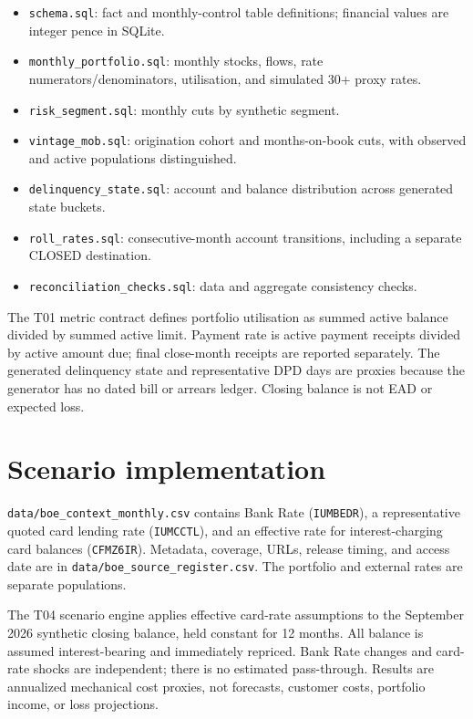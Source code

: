 \documentclass[11pt]{article}
\begin{document}
\begin{itemize}
\item \texttt{schema.sql}: fact and monthly-control table definitions; financial values are integer pence in SQLite.
\item \texttt{monthly\_portfolio.sql}: monthly stocks, flows, rate numerators/denominators, utilisation, and simulated 30+ proxy rates.
\item \texttt{risk\_segment.sql}: monthly cuts by synthetic segment.
\item \texttt{vintage\_mob.sql}: origination cohort and months-on-book cuts, with observed and active populations distinguished.
\item \texttt{delinquency\_state.sql}: account and balance distribution across generated state buckets.
\item \texttt{roll\_rates.sql}: consecutive-month account transitions, including a separate CLOSED destination.
\item \texttt{reconciliation\_checks.sql}: data and aggregate consistency checks.
\end{itemize}

The T01 metric contract defines portfolio utilisation as summed active balance divided by summed active limit. Payment rate is active payment receipts divided by active amount due; final close-month receipts are reported separately. The generated delinquency state and representative DPD days are proxies because the generator has no dated bill or arrears ledger. Closing balance is not EAD or expected loss.

\section{Scenario implementation}

\texttt{data/boe\_context\_monthly.csv} contains Bank Rate (\texttt{IUMBEDR}), a representative quoted card lending rate (\texttt{IUMCCTL}), and an effective rate for interest-charging card balances (\texttt{CFMZ6IR}). Metadata, coverage, URLs, release timing, and access date are in \texttt{data/boe\_source\_register.csv}. The portfolio and external rates are separate populations.

The T04 scenario engine applies effective card-rate assumptions to the September 2026 synthetic closing balance, held constant for 12 months. All balance is assumed interest-bearing and immediately repriced. Bank Rate changes and card-rate shocks are independent; there is no estimated pass-through. Results are annualized mechanical cost proxies, not forecasts, customer costs, portfolio income, or loss projections.
\end{document}
